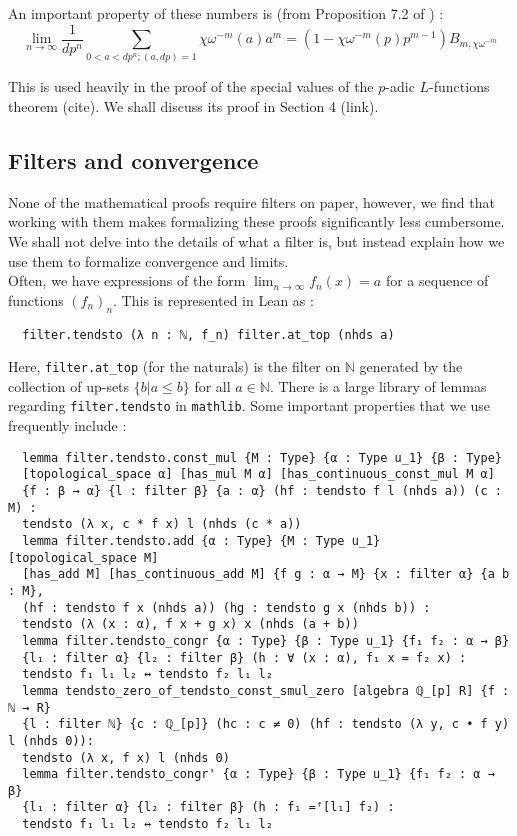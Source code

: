 \documentclass[11pt]{article}
\newcommand{\lean}[1]{\texttt{#1}\xspace} %
\begin{document}
An important property of these numbers is (from Proposition 7.2 of \cite{cyc}) : 
$$ \lim_{n \to \infty} \frac{1}{dp^{n}} \sum_{0 < a < dp^{n} ; (a, dp) = 1} \chi \omega^{-m} (a) a^{m} = 
  (1 - \chi \omega^{-m} (p) p^{m-1}) B_{m, \chi \omega^{-m}} $$

This is used heavily in the proof of the special values of the $p$-adic $L$-functions theorem (cite). 
We shall discuss its proof in Section 4 (link).

\subsection{Filters and convergence}
None of the mathematical proofs require filters on paper, however, we find that working with them makes 
formalizing these proofs significantly less cumbersome. We shall not delve into the details of what a 
filter is, but instead explain how we use them to formalize convergence and limits. \\

Often, we have expressions of the form $\lim_{n \to \infty} f_n(x) = a$ for a sequence of functions $(f_n)_n$. 
This is represented in Lean as :
\begin{lstlisting}
  filter.tendsto (λ n : ℕ, f_n) filter.at_top (nhds a)
\end{lstlisting}
Here, \lean{filter.at\_top} (for the naturals) is the filter on $\mathbb{N}$ generated by the collection of up-sets $\{ b | a \leq b \}$ 
for all $a \in \mathbb{N}$. There is a large library of lemmas regarding \lean{filter.tendsto} in \lean{mathlib}. 
Some important properties that we use frequently include :
\begin{lstlisting}
  lemma filter.tendsto.const_mul {M : Type} {α : Type u_1} {β : Type} 
  [topological_space α] [has_mul M α] [has_continuous_const_mul M α] 
  {f : β → α} {l : filter β} {a : α} (hf : tendsto f l (nhds a)) (c : M) :
  tendsto (λ x, c * f x) l (nhds (c * a))
  lemma filter.tendsto.add {α : Type} {M : Type u_1} [topological_space M] 
  [has_add M] [has_continuous_add M] {f g : α → M} {x : filter α} {a b : M}, 
  (hf : tendsto f x (nhds a)) (hg : tendsto g x (nhds b)) : 
  tendsto (λ (x : α), f x + g x) x (nhds (a + b))
  lemma filter.tendsto_congr {α : Type} {β : Type u_1} {f₁ f₂ : α → β} 
  {l₁ : filter α} {l₂ : filter β} (h : ∀ (x : α), f₁ x = f₂ x) : 
  tendsto f₁ l₁ l₂ ↔ tendsto f₂ l₁ l₂
  lemma tendsto_zero_of_tendsto_const_smul_zero [algebra ℚ_[p] R] {f : ℕ → R} 
  {l : filter ℕ} {c : ℚ_[p]} (hc : c ≠ 0) (hf : tendsto (λ y, c • f y) l (nhds 0)):
  tendsto (λ x, f x) l (nhds 0) 
  lemma filter.tendsto_congr' {α : Type} {β : Type u_1} {f₁ f₂ : α → β} 
  {l₁ : filter α} {l₂ : filter β} (h : f₁ =ᶠ[l₁] f₂) : 
  tendsto f₁ l₁ l₂ ↔ tendsto f₂ l₁ l₂
\end{lstlisting}
\end{document}
